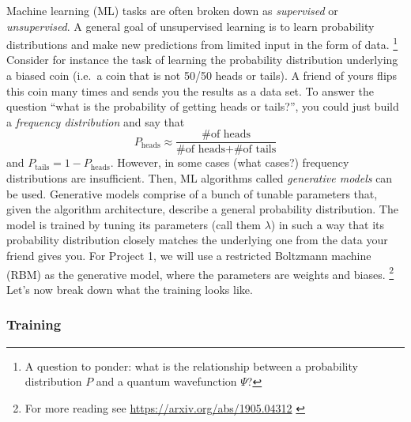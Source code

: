 \documentclass[12pt]{article}
\begin{document}
Machine learning (ML) tasks are often broken down as {\it supervised} or {\it unsupervised}.  A general goal of unsupervised learning is 
to learn probability distributions and make new predictions from limited input in the form of data. 
\footnote{A question to ponder: what is the relationship between a probability distribution $P$ and a quantum wavefunction $\Psi$?}
Consider for instance the task of learning the probability distribution underlying 
a biased coin (i.e.~a coin that is not 50/50 heads or tails). A friend of yours flips this coin many times and sends you the results as a data set. 
To answer the question ``what is the probability of getting heads or tails?'', you could just build a {\it frequency distribution} and say that 
$$
    P_{\text{heads}} \approx \frac{\text{\# of heads}}{\text{\# of heads} + \text{\# of tails}} 
$$
and $ P_{\text{tails}} = 1 - P_{\text{heads}}$.  However, in some cases (what cases?) frequency distributions are insufficient.  Then, ML algorithms called {\it generative 
models} can be used. Generative models comprise of a bunch of tunable parameters that, given the algorithm architecture, describe a general probability distribution. 
The model is trained by tuning its parameters (call them $\lambda$) in such a way that its probability distribution closely matches the underlying one from the data your friend gives you. 
For Project 1, we will use a restricted Boltzmann machine (RBM) as the generative model, where the parameters are weights and biases.
\footnote{For more reading see \textcolor{blue}{ \href{https://arxiv.org/abs/1905.04312}{https://arxiv.org/abs/1905.04312} }}
Let's now break down what the training looks like.

\subsubsection{Training}
\end{document}
